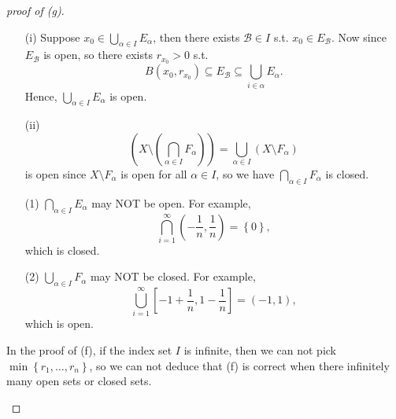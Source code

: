 \begin{proof}[proof of (g)]
    \vphantom{text}
    \begin{itemize}
        \item [(i)] Suppose \(x_0 \in \bigcup_{\alpha \in I} E_\alpha  \), then there exists \(\mathcal{B} \in I\) s.t. \(x_0 \in E_{\mathcal{B} }\). Now since \(E_{\mathcal{B} }\) is open, so there exists \(r_{x_0} > 0\) s.t. 
    \[
        B(x_0, r_{x_0}) \subseteq E_{\mathcal{B} } \subseteq \bigcup_{i \in \alpha } E_\alpha . 
    \] Hence, \(\bigcup_{\alpha \in I} E_\alpha  \) is open.
        \item [(ii)]     \[
        \left( X \setminus \left( \bigcap_{\alpha \in I} F_\alpha \right)  \right) = \bigcup_{\alpha \in I} \left( X \setminus F_\alpha \right) 
    \] is open since \(X \setminus F_\alpha\) is open for all \(\alpha \in I\), so we have \(\bigcap_{\alpha \in I} F_\alpha  \) is closed. 
    \end{itemize}

    \begin{remark}
        \vphantom{text}
        \begin{itemize}
            \item [(1)] \(\bigcap_{\alpha \in I} E_\alpha  \) may NOT be open. For example,
            \[
                \bigcap_{i=1}^{\infty} \left( - \frac{1}{n}, \frac{1}{n} \right) = \left\{ 0 \right\},
            \]
            which is closed. 
            \item [(2)] \(\bigcup_{\alpha \in I} F_\alpha \) may NOT be closed.  For example, 
            \[
                \bigcup_{i=1}^{\infty} \left[ -1 + \frac{1}{n}, 1 - \frac{1}{n}\right] = (-1, 1),
            \] which is open.
        \end{itemize}
    \end{remark}
    \begin{note}
        In the proof of (f), if the index set \(I\) is infinite, then we can not pick \(\min \left\{ r_1, \dots , r_n \right\} \), so we can not deduce that (f) is correct when there infinitely many open sets or closed sets.  
    \end{note}
\end{proof}
